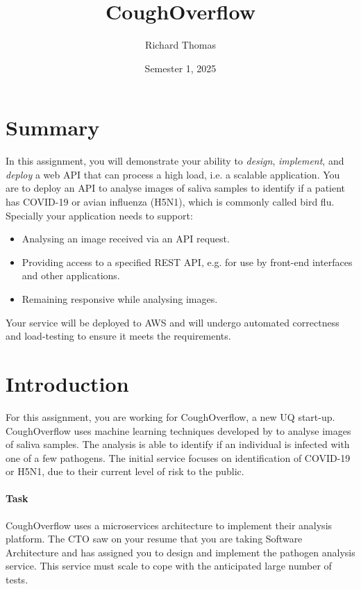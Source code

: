 \documentclass{csse4400}
\title{CoughOverflow}
\author{Richard Thomas}
\date{Semester 1, 2025}
\begin{document}

\maketitle


\section*{Summary}
In this assignment, you will demonstrate your ability to \textit{design},
\textit{implement}, and \textit{deploy} a web API that can process a high load,
i.e. a scalable application.
You are to deploy an API to analyse images of saliva samples to identify if a patient has COVID-19
or avian influenza (H5N1), which is commonly called bird flu.
Specially your application needs to support:
\begin{itemize}
    \item Analysing an image received via an API request.
    \item Providing access to a specified REST API, e.g. for use by front-end interfaces and other applications.
    \item Remaining responsive while analysing images.
\end{itemize}

\noindent
Your service will be deployed to AWS and will undergo automated correctness and load-testing to ensure it meets the requirements.


\section{Introduction}

For this assignment, you are working for CoughOverflow, a new UQ start-up.
CoughOverflow uses machine learning techniques developed by
to analyse images of saliva samples.
The analysis is able to identify if an individual is infected with one of a few pathogens.
The initial service focuses on identification of COVID-19 or H5N1,
due to their current level of risk to the public.

\paragraph{Task}
CoughOverflow uses a microservices architecture to implement their analysis platform.
The CTO saw on your resume that you are taking Software Architecture
and has assigned you to design and implement the pathogen analysis service.
This service must scale to cope with the anticipated large number of tests.
\end{document}

